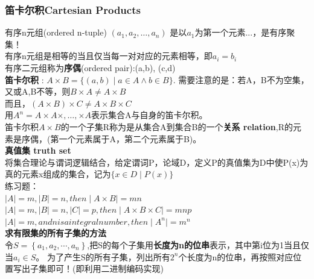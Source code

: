 \documentclass{article}
\begin{document}
    \subsubsection{笛卡尔积Cartesian Products}
    有序n元组(ordered n-tuple) $(a_1,a_2,\dots,a_n)$ 是以$a_1$为第一个元素...，是有序聚集！
    \\
    有序n元组是相等的当且仅当每一对对应的元素相等，即$a_i = b_i$ \\
    有序二元组称为\textbf{序偶}(ordered pair):(a,b), (c,d) \\
    \textbf{笛卡尔积} : $A\times B = \{(a,b) \mid a \in A \wedge b \in B\}$. 需要注意的是：若A，B不为空集，又或A,B不等，则$B\times A \neq A\times B$
    \\
    而且，$(A\times B)\times C \neq A \times B \times C$\\
    用$A^n=A\times A \times ,\dots, \times A$表示集合A与自身的笛卡尔积。\\
    笛卡尔积$A\times B$的一个子集R称为是从集合A到集合B的一个\textbf{关系 relation},R的元素是序偶，(第一个元素属于A，第二个元素属于B)。
    \\
    \textbf{真值集 truth set}\\
    将集合理论与谓词逻辑结合，给定谓词P，论域D，定义P的真值集为D中使P(x)为真的元素x组成的集合，记为$\{x \in D \mid P(x)\}$
    \\
    练习题：\\
    $\mid A \mid=m, \mid B \mid =n, then \mid A \times B \mid = mn$\\
    $\mid A \mid=m, \mid B \mid =n, \mid C\mid = p, then \mid A \times B \times C\mid = mnp$\\
    $\mid A \mid=m, and n is a integral number, then \mid A^n \mid = m^n $\\
    \textbf{求有限集的所有子集的方法}\\
    令$S=\left\{a_{1}, a_{2}, \cdots, a_{n}\right\}$,把S的每个子集用\textbf{长度为n的位串}表示，其中第i位为1当且仅当$a_i \in S$。
    为了产生S的所有子集，列出所有$2^n$个长度为n的位串，再按照对应位置写出子集即可！(即利用二进制编码实现)\\
\end{document}
